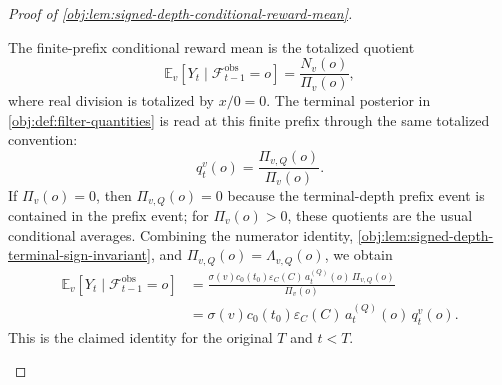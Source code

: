 \begin{proof}[Proof of \cref{obj:lem:signed-depth-conditional-reward-mean}]
\begin{enumerate}
The finite-prefix conditional reward mean is the totalized quotient
\[
\mathbb E_v[Y_t\mid \mathcal F_{t-1}^{\mathrm{obs}}=o]
=
\frac{N_v(o)}{\Pi_v(o)},
\]
where real division is totalized by \(x/0=0\). The terminal posterior in \cref{obj:def:filter-quantities} is read at this finite prefix through the same totalized convention:
\[
q_t^v(o)=\frac{\Pi_{v,Q}(o)}{\Pi_v(o)}.
\]
If \(\Pi_v(o)=0\), then \(\Pi_{v,Q}(o)=0\) because the terminal-depth prefix event is contained in the prefix event; for \(\Pi_v(o)>0\), these quotients are the usual conditional averages. Combining the numerator identity, \cref{obj:lem:signed-depth-terminal-sign-invariant}, and \(\Pi_{v,Q}(o)=\Lambda_{v,Q}(o)\), we obtain
\[
\begin{aligned}
\mathbb E_v[Y_t\mid \mathcal F_{t-1}^{\mathrm{obs}}=o]
&=
\frac{\sigma(v)c_0(t_0)\varepsilon_C(C)\,
a_t^{(Q)}(o)\,\Pi_{v,Q}(o)}{\Pi_v(o)} \\
&=
\sigma(v)c_0(t_0)\varepsilon_C(C)\,
a_t^{(Q)}(o)\,q_t^v(o).
\end{aligned}
\]
This is the claimed identity for the original \(T\) and \(t<T\). %
\end{enumerate}
\end{proof}
